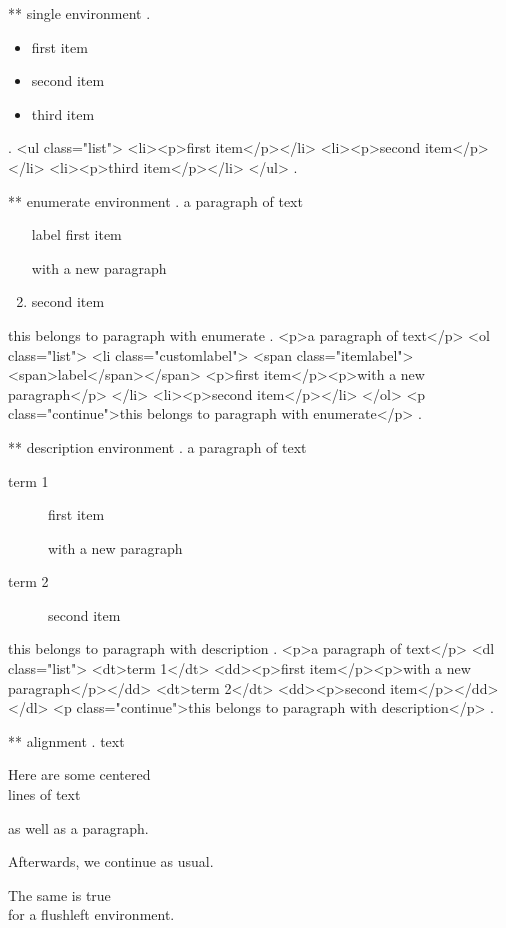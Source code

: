 ** single environment
.
\begin{itemize}
    \item first item
    \item second item
    \item third item
\end{itemize}
.
<ul class="list">
<li><p>ﬁrst item</p></li>
<li><p>second item</p></li>
<li><p>third item</p></li>
</ul>
.



** enumerate environment
.
a paragraph of text

\begin{enumerate}
    \item[label] first item

        with a new paragraph
    \item second item
\end{enumerate}
this belongs to paragraph with enumerate
.
<p>a paragraph of text</p>
<ol class="list">
<li class="customlabel">
<span class="itemlabel"><span>label</span></span>
<p>ﬁrst item</p><p>with a new paragraph</p>
</li>
<li><p>second item</p></li>
</ol>
<p class="continue">this belongs to paragraph with enumerate</p>
.


** description environment
.
a paragraph of text

\begin{description}
    \item[term 1] first item

        with a new paragraph
    \item[term 2] second item
\end{description}
this belongs to paragraph with description
.
<p>a paragraph of text</p>
<dl class="list">
<dt>term 1</dt>
<dd><p>ﬁrst item</p><p>with a new paragraph</p></dd>
<dt>term 2</dt>
<dd><p>second item</p></dd>
</dl>
<p class="continue">this belongs to paragraph with description</p>
.




** alignment
.
text
\begin{center}
    Here are some centered\\
    lines of text

    as well as a paragraph.
\end{center}
Afterwards, we continue as usual.
\begin{flushleft}
    The same is true\\
    for a flushleft environment.
\end{flushleft}

